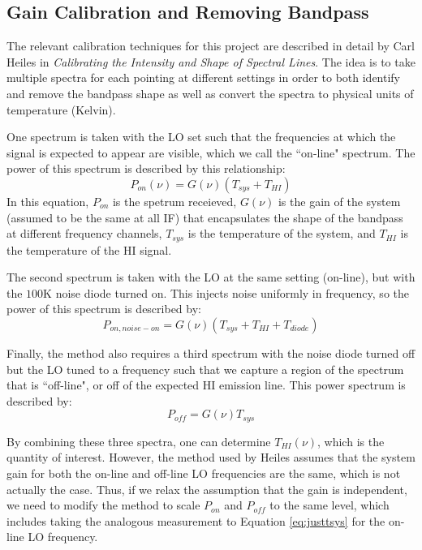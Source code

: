 \documentclass[12pt]{article}
\begin{document}
\subsection*{Gain Calibration and Removing Bandpass}
The relevant calibration techniques for this project are described in detail by Carl Heiles in \textit{Calibrating the Intensity and Shape of Spectral Lines}. The idea is to take multiple spectra for each pointing at different settings in order to both identify and remove the bandpass shape as well as convert the spectra to physical units of temperature (Kelvin).

One spectrum is taken with the LO set such that the frequencies at which the signal is expected to appear are visible, which we call the ``on-line" spectrum. The power of this spectrum is described by this relationship:
\begin{equation}
P_{on}(\nu) = G(\nu) (T_{sys} + T_{HI}) \label{eq:pon}
\end{equation} 
In this equation, $P_{on}$ is the spetrum receieved, $G(\nu)$ is the gain of the system (assumed to be the same at all IF) that encapsulates the shape of the bandpass at different frequency channels, $T_{sys}$ is the temperature of the system, and $T_{HI}$ is the temperature of the HI signal.

The second spectrum is taken with the LO at the same setting (on-line), but with the $100\mathrm{K}$ noise diode turned on. This injects noise uniformly in frequency, so the power of this spectrum is described by:
\begin{equation}
P_{on, noise-on} = G(\nu) (T_{sys} + T_{HI} + T_{diode}) \label{eq:ponon}
\end{equation}

Finally, the method also requires a third spectrum with the noise diode turned off but the LO tuned to a frequency such that we capture a region of the spectrum that is ``off-line", or off of the expected HI emission line. This power spectrum is described by:
\begin{equation}
P_{off} = G(\nu) T_{sys} \label{eq:justtsys}
\end{equation}

By combining these three spectra, one can determine $T_{HI}(\nu)$, which is the quantity of interest. However, the method used by Heiles assumes that the system gain for both the on-line and off-line LO frequencies are the same, which is not actually the case. Thus, if we relax the assumption that the gain is independent, we need to modify the method to scale $P_{on}$ and $P_{off}$ to the same level, which includes taking the analogous measurement to Equation \ref{eq:justtsys} for the on-line LO frequency.
\end{document}
